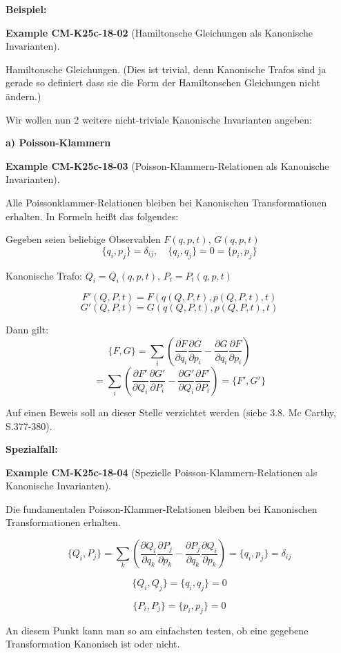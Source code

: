 \documentclass[10pt, letterpaper]{article}
\newcommand{\CustomHeading}[3]{%
  \par\medskip\noindent%
  \textbf{#1 #2} \textnormal{(#3)}.\enskip%
}
\newenvironment{EXA}[2]{\begin{unitbox}\CustomHeading{Example}{#1}{#2}}{\end{unitbox}}
\begin{document}
\textbf{Beispiel:} 

\begin{EXA}{CM-K25c-18-02}{Hamiltonsche Gleichungen als Kanonische Invarianten}
Hamiltonsche Gleichungen. (Dies ist trivial, denn Kanonische Trafos sind ja gerade so definiert dass sie die Form der Hamiltonschen Gleichungen nicht ändern.)
\end{EXA}

Wir wollen nun 2 weitere nicht-triviale Kanonische Invarianten angeben:

\textbf{a) Poisson-Klammern}


\begin{EXA}{CM-K25c-18-03}{Poisson-Klammern-Relationen als Kanonische Invarianten}
Alle Poissonklammer-Relationen bleiben bei Kanonischen Transformationen erhalten. In Formeln heißt das folgendes:

Gegeben seien beliebige Observablen $F(q,p,t)$, $G(q,p,t)$
\[
\{q_i, p_j\} = \delta_{ij}, \quad \{q_i, q_j\} = 0 = \{p_i, p_j\}
\]

Kanonische Trafo: $Q_i = Q_i(q,p,t)$, $P_i = P_i(q,p,t)$

\[
F'(Q,P,t) = F(q(Q,P,t), p(Q,P,t), t)
\]
\[
G'(Q,P,t) = G(q(Q,P,t), p(Q,P,t), t)
\]

Dann gilt: $$\{F, G\} = \sum_i \left(\frac{\partial F}{\partial q_i} \frac{\partial G}{\partial p_i} - \frac{\partial G}{\partial q_i} \frac{\partial F}{\partial p_i}\right)$$
\[
= \sum_i \left(\frac{\partial F'}{\partial Q_i} \frac{\partial G'}{\partial P_i} - \frac{\partial G'}{\partial Q_i} \frac{\partial F'}{\partial P_i}\right) = \{F', G'\}
\]
\end{EXA}

Auf einen Beweis soll an dieser Stelle verzichtet werden (siehe 3.8. Mc Carthy, S.377-380).

\textbf{Spezialfall:}


\begin{EXA}{CM-K25c-18-04}{Spezielle Poisson-Klammern-Relationen als Kanonische Invarianten}
Die fundamentalen Poisson-Klammer-Relationen bleiben bei Kanonischen Transformationen erhalten.

$$\{Q_i, P_j\} = \sum_k \left(\frac{\partial Q_i}{\partial q_k} \frac{\partial P_j}{\partial p_k} - \frac{\partial P_j}{\partial q_k} \frac{\partial Q_i}{\partial p_k}\right) = \{q_i, p_j\} = \delta_{ij}$$

$$\{Q_i, Q_j\} = \{q_i, q_j\} = 0$$

$$\{P_i, P_j\} = \{p_i, p_j\} = 0$$

An diesem Punkt kann man so am einfachsten testen, ob eine gegebene Transformation Kanonisch ist oder nicht.
\end{EXA}
\end{document}

